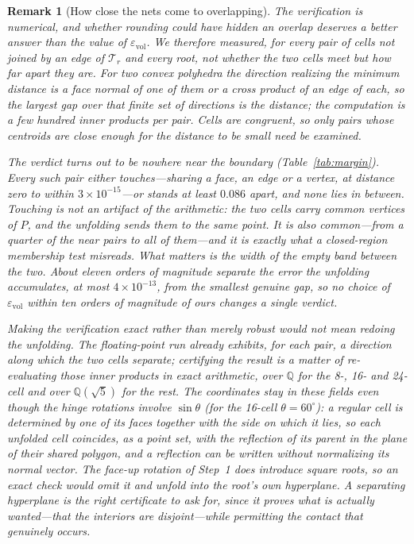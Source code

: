 \documentclass[11pt,letterpaper]{article}
\newtheorem{remark}{Remark}
\newcommand{\eps}{\varepsilon}
\begin{document}
\begin{remark}[How close the nets come to overlapping]\label{rem:margin}
The verification is numerical, and whether rounding could have hidden an
overlap deserves a better answer than the value of
$\eps_{\mathrm{vol}}$.
We therefore measured, for every pair of cells not joined by an edge of
$\mathcal{T}_r$ and every root, not whether the two cells meet but how far
apart they are.
For two convex polyhedra the direction realizing the minimum distance is a
face normal of one of them or a cross product of an edge of each, so the
largest gap over that finite set of directions \emph{is} the distance; the
computation is a few hundred inner products per pair.
Cells are congruent, so only pairs whose centroids are close enough for the
distance to be small need be examined.

The verdict turns out to be nowhere near the boundary
(Table~\ref{tab:margin}).
Every such pair either touches---sharing a face, an edge or a vertex, at
distance zero to within $3\times10^{-15}$---or stands at least $0.086$
apart, and none lies in between.
Touching is not an artifact of the arithmetic: the two cells carry common
vertices of $P$, and the unfolding sends them to the same point.
It is also common---from a quarter of the near pairs to all of them---and
it is exactly what a closed-region membership test misreads.
What matters is the width of the empty band between the two.
About eleven orders of magnitude separate the error the unfolding
accumulates, at most $4\times10^{-13}$, from the smallest genuine gap, so
no choice of $\eps_{\mathrm{vol}}$ within ten orders of magnitude of ours
changes a single verdict.

Making the verification exact rather than merely robust would not mean
redoing the unfolding.
The floating-point run already exhibits, for each pair, a direction along
which the two cells separate; certifying the result is a matter of
re-evaluating those inner products in exact arithmetic, over $\mathbb{Q}$
for the 8-, 16- and 24-cell and over $\mathbb{Q}(\sqrt{5})$ for the rest.
The coordinates stay in these fields even though the hinge rotations
involve $\sin\theta$ (for the 16-cell $\theta=60^\circ$): a regular cell
is determined by one of its faces together with the side on which it
lies, so each unfolded cell coincides, as a point set, with the
reflection of its parent in the plane of their shared polygon, and a
reflection can be written without normalizing its normal vector.
The face-up rotation of Step~1 does introduce square roots, so an exact
check would omit it and unfold into the root's own hyperplane.
A separating hyperplane is the right certificate to ask for, since it
proves what is actually wanted---that the interiors are disjoint---while
permitting the contact that genuinely occurs.
\end{remark}
\end{document}
